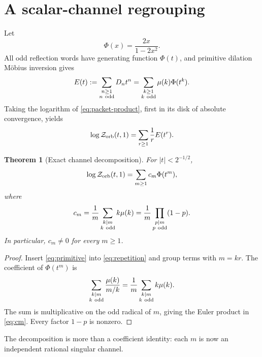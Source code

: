 \documentclass[11pt]{article}
\newtheorem{theorem}{Theorem}[section]
\newcommand{\Zorb}{\mathcal Z_{\rm orb}}
\newcommand{\PhiF}{\Phi}
\begin{document}
\section{A scalar-channel regrouping}

Let
\begin{equation}\label{eq:Phi}
 \PhiF(x)=\frac{2x}{1-2x^2}.
\end{equation}
All odd reflection words have generating function $\PhiF(t)$, and primitive
dilation M\"obius inversion gives
\begin{equation}\label{eq:primitive}
 E(t):=\sum_{\substack{n\ge1\\n\ {\rm odd}}}D_nt^n
 =\sum_{\substack{k\ge1\\k\ {\rm odd}}}\mu(k)\PhiF(t^k).
\end{equation}
Taking the logarithm of \eqref{eq:packet-product}, first in its disk of
absolute convergence, yields
\begin{equation}\label{eq:repetition}
 \log\Zorb(t,1)=\sum_{r\ge1}\frac1rE(t^r).
\end{equation}

\begin{theorem}[Exact channel decomposition]\label{thm:channels}
For $|t|<2^{-1/2}$,
\begin{equation}\label{eq:channels}
 \log\Zorb(t,1)=\sum_{m\ge1}c_m\PhiF(t^m),
\end{equation}
where
\begin{equation}\label{eq:cm}
 c_m=\frac1m\sum_{\substack{k\mid m\\k\ {\rm odd}}}k\mu(k)
 =\frac1m\prod_{\substack{p\mid m\\p\ {\rm odd}}}(1-p).
\end{equation}
In particular, $c_m\ne0$ for every $m\ge1$.
\end{theorem}

\begin{proof}
Insert \eqref{eq:primitive} into \eqref{eq:repetition} and group terms with
$m=kr$.  The coefficient of $\PhiF(t^m)$ is
\[
 \sum_{\substack{k\mid m\\k\ {\rm odd}}}\frac{\mu(k)}{m/k}
 =\frac1m\sum_{\substack{k\mid m\\k\ {\rm odd}}}k\mu(k).
\]
The sum is multiplicative on the odd radical of $m$, giving the Euler
product in \eqref{eq:cm}.  Every factor $1-p$ is nonzero.
\end{proof}

The decomposition is more than a coefficient identity: each $m$ is now an
independent rational singular channel.
\end{document}
